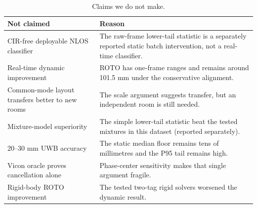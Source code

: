 \documentclass[11pt,a4paper]{article}
\begin{document}
\begin{table}[h]
\centering
\caption{Claims we do not make.}
\small
\begin{tabular}{@{}p{49mm}p{88mm}@{}}
\toprule
Not claimed & Reason \\
\midrule
CIR-free deployable NLOS classifier & The raw-frame lower-tail statistic is a separately reported static batch intervention, not a real-time classifier. \\
Real-time dynamic improvement & ROTO has one-frame ranges and remains around 101.5 mm under the conservative alignment. \\
Common-mode layout transfers better to new rooms & The scale argument suggests transfer, but an independent room is still needed. \\
Mixture-model superiority & The simple lower-tail statistic beat the tested mixtures in this dataset (reported separately). \\
20--30 mm UWB accuracy & The static median floor remains tens of millimetres and the P95 tail remains high. \\
Vicon oracle proves cancellation alone & Phase-center sensitivity makes that single argument fragile. \\
Rigid-body ROTO improvement & The tested two-tag rigid solvers worsened the dynamic result. \\
\bottomrule
\end{tabular}
\end{table}
\end{document}
